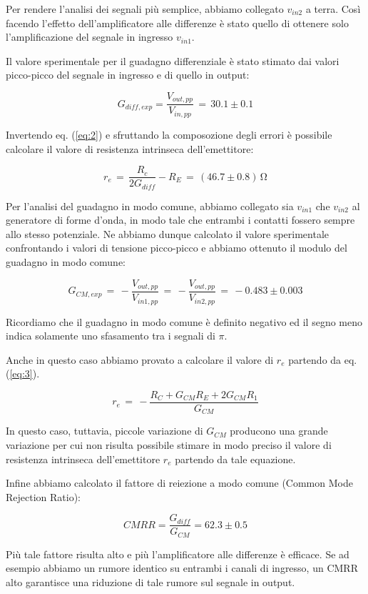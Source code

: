 \noindent Per rendere l'analisi dei segnali più semplice, abbiamo collegato $v_{in2}$ a terra.
Così facendo l'effetto dell'amplificatore alle differenze è stato quello di ottenere solo l'amplificazione del segnale in ingresso $v_{in1}$. 

Il valore sperimentale per il guadagno differenziale è stato stimato dai valori picco-picco del segnale in ingresso e di quello in output:

	$$G_{diff,exp}=\frac{V_{out,pp}}{V_{in,pp}} \, = \, 30.1 \pm 0.1$$

Invertendo eq. (\ref{eq:2}) e sfruttando la composozione degli errori è possibile calcolare il valore di resistenza intrinseca dell'emettitore:

$$ r_e \, = \, \frac{R_c}{2G_{diff}}-R_E \, = \, (46.7\pm0.8) \, \si{\ohm}$$

\noindent Per l'analisi del guadagno in modo comune, abbiamo collegato sia $v_{in1}$ che $v_{in2}$ al generatore di forme d'onda, in modo tale che entrambi i contatti fossero sempre allo stesso potenziale.
Ne abbiamo dunque calcolato il valore sperimentale confrontando i valori di tensione picco-picco e abbiamo ottenuto il modulo del guadagno in modo comune:

$$	G_{CM,exp} \,=\, -\frac{V_{out,pp}}{V_{in1,pp}} \, = \, -\frac{V_{out,pp}}{V_{in2,pp}} \, = \, -0.483 \pm 0.003$$

\noindent Ricordiamo che il guadagno in modo comune è definito negativo ed il segno meno indica solamente uno sfasamento tra i segnali di $\pi$.

Anche in questo caso abbiamo provato a calcolare il valore di $r_e$ partendo da eq. (\ref{eq:3}).

\begin{equation}
	r_e \, = \, -\frac{R_C+G_{CM}R_E+2G_{CM}R_1}{G_{CM}}
\end{equation}

\noindent In questo caso, tuttavia, piccole variazione di $G_{CM}$ producono una grande variazione per cui non risulta possibile stimare in modo preciso il valore di resistenza intrinseca dell'emettitore $r_e$ partendo da tale equazione.

Infine abbiamo calcolato il fattore di reiezione a modo comune (Common Mode Rejection Ratio):

\begin{equation}
CMRR=\frac{G_{diff}}{G_{CM}}=62.3\pm0.5
\end{equation}

Più tale fattore risulta alto e più l'amplificatore alle differenze è efficace.
Se ad esempio abbiamo un rumore identico su entrambi i canali di ingresso, un CMRR alto garantisce una riduzione di tale rumore sul segnale in output.

